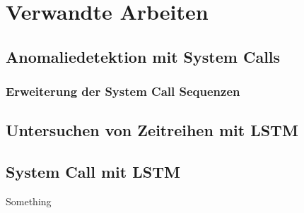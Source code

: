 \chapter{Verwandte Arbeiten}\label{ch:verwandte_arbeiten}
\section{Anomaliedetektion mit System Calls}

\subsection{Erweiterung der System Call Sequenzen}

\section{Untersuchen von Zeitreihen mit LSTM}

\section{System Call mit LSTM}
    Something~\cite{LSTMsys}

